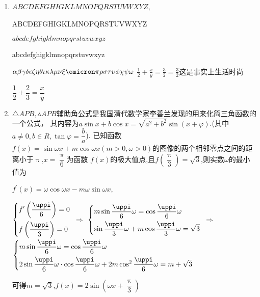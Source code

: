 \documentclass{sxtzh}
\begin{document}
    \danxuan
\begin{enumerate}
    \item $ABCDEFGHIGKLMNOPQRSTUVWXYZ$,\par
    ABCDEFGHIGKLMNOPQRSTUVWXYZ\par
    $abcdefghigklmnopqrstuvwxyz$\par
    abcdefghigklmnopqrstuvwxyz\par
        $\alpha \beta \gamma \delta \epsilon \zeta \eta \theta \iota \kappa \lambda \mu \nu \xi \omicron \pi \rho \sigma \tau \upsilon \phi \chi \psi \omega$
        $\frac{1}{2}+\frac{x}{y}=\frac{3}{2}=\frac{3}{2}$这是事实上生活时尚\par
        $\dfrac{1}{2}+\dfrac{2}{3}=\dfrac{x}{y}$
    \item {}$\triangle APB, \vartriangle APB$辅助角公式是我国清代数学家李善兰发现的用来化简三角函数的一个公式，
    其内容为$a \sin{x} +b \cos {x} =\sqrt{a^2+b^2}\sin(x+\varphi)$.(其中$a \neq 0,b\in R, \tan \varphi = \dfrac{b}{a}$).
    已知函数$f(x)=\sin{\omega x} + m\cos{\omega x} (m>0,\omega>0)$的图像的两个相邻零点之间的距离小于$\uppi$,$x=\dfrac{\uppi}{6}$为函数
    $f(x)$的极大值点,且$f\left(\dfrac{\uppi}{3}\right)=\sqrt{3}$,则实数$\omega $的最小值为
    \begin{solution}
        $f^\prime (x) = \omega \cos \omega x - m \omega \sin \omega x$,
        \par
        $\begin{dcases}
            f^\prime\left(\dfrac{\uppi}{6}\right)=0 \\
            f\left(\dfrac{\uppi}{3}\right)=0 
        \end{dcases}$
        $\Rightarrow$
        $\begin{dcases}
         m\sin{\dfrac{\uppi}{6}\omega} = \cos{\dfrac{\uppi}{6}\omega }\\
           \sin{\dfrac{\uppi}{3}\omega} + m\cos{\dfrac{\uppi}{3}\omega}=\sqrt{3} 
        \end{dcases}$
        $\Rightarrow$
       $\begin{dcases}
        m\sin \dfrac{\uppi}{6}\omega = \cos \dfrac{\uppi}{6}\omega \\
        2\sin{\dfrac{\uppi}{6}\omega} \cdot \cos{\dfrac{\uppi}{6}\omega}+2m\cos^2{\dfrac{\uppi}{6}\omega}=m+\sqrt{3}
       \end{dcases}$
       \par
       可得$m=\sqrt{3}$,$f(x)=2\sin(\omega x+\dfrac{\uppi}{3})$

\end{solution}
\end{enumerate}
\end{document}
